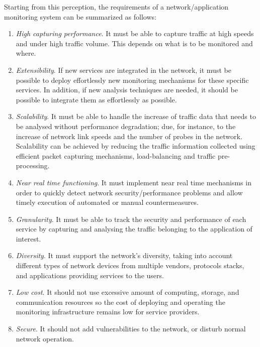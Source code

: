 Starting from this perception, the requirements of a network/application monitoring system can be summarized as follows:
\begin{enumerate}
\item
\textit{High capturing performance}. It must be able to capture traffic at high speeds and under high traffic volume. This depends on what is to be monitored and where.
\item
\textit{Extensibility}. If new services are integrated in the network, it must be possible to deploy effortlessly new monitoring mechanisms for these specific services. In addition, if new analysis techniques are needed, it should be possible to integrate them as effortlessly as possible.
\item
\textit{Scalability}. It must be able to handle the increase of traffic data that needs to be analysed without performance degradation; due, for instance, to the increase of network link speeds and the number of probes in the network. Scalability can be achieved by reducing the traffic information collected using efficient packet capturing mechanisms, load-balancing and traffic pre-processing.
\item
\textit{Near real time functioning}. It must implement near real time mechanisms in order to quickly detect network security/performance problems and allow timely execution of automated or manual countermeasures.
\item
\textit{Granularity}. It must be able to track the security and performance of each service by capturing and analysing the traffic belonging to the application of interest.
\item
\textit{Diversity}. It must support the network{\textquoteright}s diversity, taking into account different types of network devices from multiple vendors, protocols stacks, and applications providing services to the users.
\item
\textit{Low cost}. It should not use excessive amount of computing, storage, and communication resources so the cost of deploying and operating the monitoring infrastructure remains low for service providers.
\item
\textit{Secure}. It should not add vulnerabilities to the network, or disturb normal network operation.
\end{enumerate}




